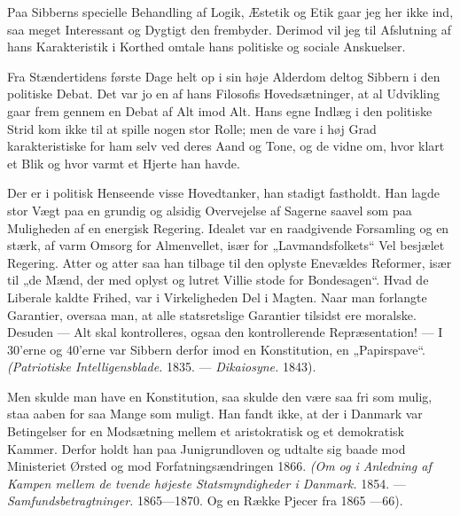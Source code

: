 \documentclass[12pt,a4paper,openany]{book}
\newcommand{\opage}[1]{\marginnote{\footnotesize\textit{[#1]}}}
\begin{document}
Paa Sibberns specielle Behandling af Logik, Æstetik og Etik gaar jeg her ikke
ind, saa meget Interessant og Dygtigt den frembyder. Derimod vil jeg til
Afslutning af hans Karakteristik i Korthed omtale hans politiske og sociale
Anskuelser.

Fra Stændertidens første Dage helt op i sin høje Alderdom deltog Sibbern i den
politiske Debat. Det var jo en af hans Filosofis Hovedsætninger, at al
Udvikling gaar frem gennem en Debat af Alt imod Alt. Hans egne Indlæg i den
politiske Strid kom ikke til at spille nogen stor Rolle; men de vare i høj Grad
karakteristiske for ham selv ved deres Aand og Tone, og de vidne om, hvor klart
et Blik og hvor varmt et Hjerte han havde.

Der er i politisk Henseende visse Hovedtanker, han stadigt fastholdt. Han lagde
stor Vægt paa en grundig og alsidig Overvejelse af Sagerne saavel som paa
Muligheden af en energisk Regering. Idealet var en raadgivende Forsamling og en
stærk, af varm Omsorg for Almenvellet, især for „Lavmandsfolkets“ Vel besjælet
Regering. Atter og atter saa han
\setcounter{footnote}{0}%
\opage{113}tilbage til den oplyste Enevældes Reformer, især til „de Mænd, der
med oplyst og lutret Villie stode for Bondesagen“. Hvad de Liberale kaldte
Frihed, var i Virkeligheden Del i Magten. Naar man forlangte Garantier, oversaa
man, at alle statsretslige Garantier tilsidst ere moralske. Desuden --- Alt
skal kontrolleres, ogsaa den kontrollerende Repræsentation! --- I 30'erne og
40'erne var Sibbern derfor imod en Konstitution, en „Papirspave“.
\textit{(Patriotiske Intelligensblade.} 1835. --- \textit{Dikaiosyne.} 1843).

Men skulde man have en Konstitution, saa skulde den være saa fri som mulig,
staa aaben for saa Mange som muligt. Han fandt ikke, at der i Danmark var
Betingelser for en Modsætning mellem et aristokratisk og et demokratisk Kammer.
Derfor holdt han paa Junigrundloven og udtalte sig baade mod Ministeriet Ørsted
og mod Forfatningsændringen 1866. \textit{(Om og i Anledning af Kampen mellem
de tvende højeste Statsmyndigheder i Danmark.} 1854. ---
\textit{Samfundsbetragtninger.} 1865---1870. Og en Række Pjecer fra 1865 ---66).
\end{document}
